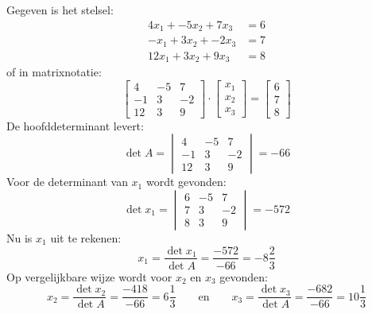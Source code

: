 \begin{example}
Gegeven is het stelsel:
%
\begin{equation}
\begin{split}\label{equ:linsystem3}
4x_1 + -5x_2 + 7x_3 &= 6 \\
-x_1 + 3x_2 + -2x_3 &= 7 \\
12x_1 + 3x_2 + 9x_3 &= 8
\end{split}
\end{equation}
%
of in matrixnotatie:
%
\begin{equation}
\begin{bmatrix}
4 & -5 & 7 \\
-1 & 3 & -2 \\
12 & 3 & 9
\end{bmatrix} \cdot
\begin{bmatrix}
x_1 \\
x_2 \\
x_3
\end{bmatrix} =
\begin{bmatrix}
6 \\
7 \\
8
\end{bmatrix}
\end{equation}
%
De hoofddeterminant levert:
\begin{equation}
\det A = 
\begin{vmatrix}
4 & -5 & 7 \\
-1 & 3 & -2 \\
12 & 3 & 9
\end{vmatrix} = -66 
\end{equation}
%
Voor de determinant van $x_1$ wordt gevonden:
\begin{equation}
\det x_1 = 
\begin{vmatrix}
6 & -5 & 7 \\
7 & 3 & -2 \\
8 & 3 & 9
\end{vmatrix} = -572 
\end{equation}
%
Nu is $x_1$ uit te rekenen:
%
\begin{equation}
x_1 = \dfrac{\det x_1}{\det A} = \dfrac{-572}{-66} = -8\dfrac{2}{3}
\end{equation}
%
Op vergelijkbare wijze wordt voor $x_2$ en $x_3$ gevonden:
%
\begin{equation}
x_2 = \dfrac{\det x_2}{\det A} = \dfrac{-418}{-66} = 6\dfrac{1}{3} \qquad\text{en}\qquad x_3 = \dfrac{\det x_3}{\det A} = \dfrac{-682}{-66} = 10\dfrac{1}{3}
\end{equation}
\end{example}

